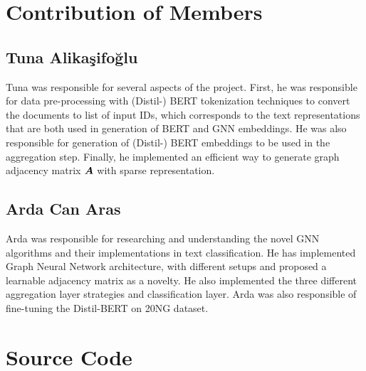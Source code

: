 \begin{appendices}
    \section{Contribution of Members}
    \subsection{Tuna Alikaşifoğlu}
    Tuna was responsible for several aspects of the project. First, he was responsible for data pre-processing with (Distil-) BERT tokenization techniques to convert the documents to list of input IDs, which corresponds to the text representations that are both used in generation of BERT and GNN embeddings. He was also responsible for generation of (Distil-) BERT embeddings to be used in the aggregation step. Finally, he implemented an efficient way to generate graph adjacency matrix \(\boldsymbol{A}\) with sparse representation.

    \subsection{Arda Can Aras}
    Arda was responsible for researching and understanding the novel GNN algorithms and their implementations in text classification. He has implemented Graph Neural Network architecture, with different setups and proposed a learnable adjacency matrix  as a novelty. He also implemented the three different aggregation layer strategies and classification layer. Arda was also responsible of fine-tuning the Distil-BERT on 20NG dataset.
    \clearpage

    \onecolumn
    \section{Source Code}
\end{appendices}

